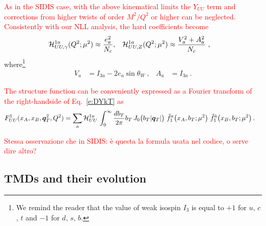 \documentclass[aps,preprintnumbers,showpacs,nofootinbib,superscriptaddress,floatfix]{revtex4}
\begin{document}
\textcolor{red}{As in the SIDIS case, with the above kinematical limits the $Y_{UU}$ term and corrections from higher twists of order $M^2/Q^2$ or higher can be neglected. Consistently with our NLL analysis, the hard coefficients become }
\begin{align} 
{\cal H}_{UU, \gamma}^{1 a}(Q^2;\mu^2) &\approx \frac{e_a^2}{N_c},
&
{\cal H}_{UU, Z}^{1 a}(Q^2;\mu^2) &\approx \frac{V_a^2+A_a^2}{N_c} \ ,
\end{align}  
where\footnote{We remind the reader that the value of weak isospin $I_3$ is equal to $+1$ for $u$, $c$, $t$ and
  $-1$ for $d$, $s$, $b$.}
\begin{align}
V_a & = I_{3a} - 2 e_{a} \sin \theta_W \  ,
&
A_a & = I_{3a} \  .
\end{align} 

\textcolor{red}{The structure function can be conveniently expressed as a Fourier transform of the right-handside of Eq.~\eqref{e:DYkT} as }
\begin{align}
\label{e:DYkTFF}
   F_{UU}^1(x_A,x_B, \bm{q}_T^2, Q^2) &=
 \sum_a {\cal H}_{UU}^{1 a} \, \int_0^{\infty} \frac{d b_T}{2 \pi} b_T\, J_0\big( b_T |\bm{q}_T|\big)\ 
      \tilde{f}_1^a\big(x_A, b_T;\mu^2\big) \   \tilde{f}_1^{\bar{a}}\big(x_B, b_T;\mu^2 \big)  \, .
\end{align} 

\textcolor{red}{ Stessa osservazione che in SIDIS: \`e questa la formula usata nel codice, o serve dire altro?}



\subsection{TMDs and their evolution}
\label{ss:TMDevo}
\end{document}
